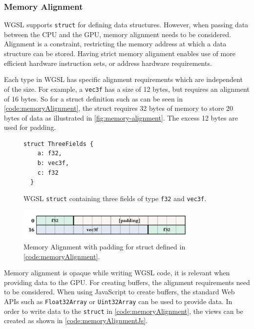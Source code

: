 \subsubsection{Memory Alignment}
\label{ch:memoryAlignmentTheory}

\gls{WGSL} supports \texttt{struct} for defining data structures. However, when passing data between the CPU and the GPU, memory alignment needs to be considered. Alignment is a constraint, restricting the memory address at which a data structure can be stored. Having strict memory alignment enables use of more efficient hardware instruction sets, or address hardware requirements.

Each type in \gls{WGSL} has specific alignment requirements which are independent of the size. For example, a \texttt{vec3f} has a size of 12 bytes, but requires an alignment of 16 bytes. So for a struct definition such as can be seen in \autoref{code:memoryAlignment}, the struct requires 32 bytes of memory to store 20 bytes of data as illustrated in \autoref{fig:memory-alignment}. The excess 12 bytes are used for padding.

\begin{figure}[H]
  \begin{lstlisting}[style=wgsl]
  struct ThreeFields {
    a: f32,
    b: vec3f,
    c: f32
  }
  \end{lstlisting}
  \caption{\gls{WGSL} \texttt{struct} containing three fields of type \texttt{f32} and \texttt{vec3f}.}
  \label{code:memoryAlignment}
  \end{figure}

\begin{figure}[H]
  \centering
  \includegraphics[width=0.8\textwidth]{resources/memory-alignment.png}
  \caption{Memory Alignment with padding for struct defined in \autoref{code:memoryAlignment}.}
  \label{fig:memory-alignment}
\end{figure}

Memory alignment is opaque while writing \gls{WGSL} code, it is relevant when providing data to the GPU. For creating buffers, the alignment requirements need to be considered. When using JavaScript to create buffers, the standard Web \glspl{API} such as \texttt{Float32Array} or \texttt{Uint32Array} can be used to provide data. In order to write data to the \texttt{struct} in \autoref{code:memoryAlignment}, the views can be created as shown in \autoref{code:memoryAlignmentJs}.

